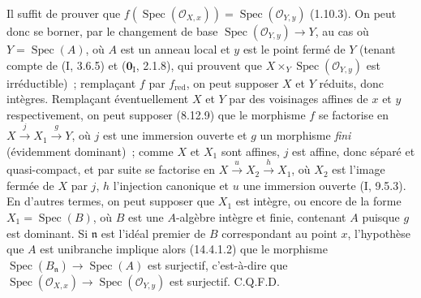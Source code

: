 Il suffit de prouver que
$f(\operatorname{Spec}(\mathcal O_{X,x}))=\operatorname{Spec}(\mathcal O_{Y,y})$
(1.10.3). On peut donc se borner, par le changement de base
$\operatorname{Spec}(\mathcal O_{Y,y})\to Y$, au cas où $Y=\operatorname{Spec}(A)$,
où $A$ est un anneau local et $y$ est le point fermé de $Y$ (tenant compte de
(I, 3.6.5) et ($\mathbf{0}_{\mathrm I}$, 2.1.8), qui prouvent que
$X\times_Y\operatorname{Spec}(\mathcal O_{Y,y})$ est irréductible)~; remplaçant $f$
par $f_{\mathrm{red}}$, on peut supposer $X$ et $Y$ réduits, donc intègres.
Remplaçant éventuellement $X$ et $Y$ par des voisinages affines de $x$ et $y$
respectivement, on peut supposer (8.12.9) que le morphisme $f$ se factorise en
$X\xrightarrow{j}X_1\xrightarrow{g}Y$, où $j$ est une immersion ouverte et $g$ un
morphisme \emph{fini} (évidemment dominant)~; comme $X$ et $X_1$ sont affines, $j$
est affine, donc séparé et quasi-compact, et par suite se factorise en
$X\xrightarrow{u}X_2\xrightarrow{h}X_1$, où $X_2$ est l'image fermée de $X$ par
$j$, $h$ l'injection canonique et $u$ une immersion ouverte (I, 9.5.3). En d'autres
termes, on peut supposer que $X_1$ est intègre, ou encore de la forme
$X_1=\operatorname{Spec}(B)$, où $B$ est une $A$-algèbre intègre et finie, contenant
$A$ puisque $g$ est dominant. Si $\mathfrak n$ est l'idéal premier de $B$
correspondant au point $x$, l'hypothèse que $A$ est unibranche implique alors
(14.4.1.2) que le morphisme
$\operatorname{Spec}(B_{\mathfrak n})\to\operatorname{Spec}(A)$ est surjectif,
c'est-à-dire que
$\operatorname{Spec}(\mathcal O_{X,x})\to\operatorname{Spec}(\mathcal O_{Y,y})$
est surjectif. C.Q.F.D.

